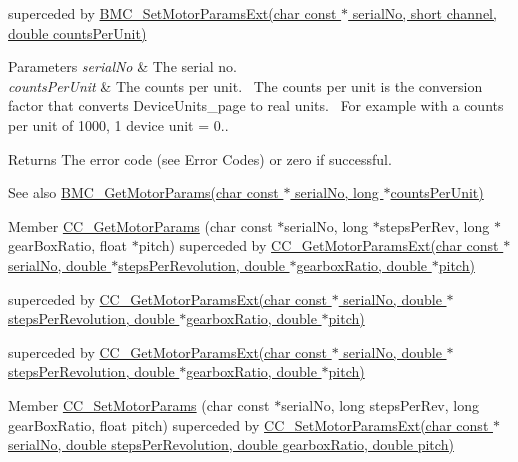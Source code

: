 superceded by \hyperlink{group___benchtop_brushless_motor_gaa40b14dfc57fee8de455b3b5f0b18490}{B\+M\+C\+\_\+\+Set\+Motor\+Params\+Ext(char const $\ast$ serial\+No, short channel, double counts\+Per\+Unit)} 


\begin{DoxyParams}{Parameters}
{\em serial\+No} & The serial no. \\
\hline
{\em counts\+Per\+Unit} & The counts per unit.~\newline
 The counts per unit is the conversion factor that converts Device\+Units\+\_\+page to real units.~\newline
 For example with a counts per unit of 1000, 1 device unit = 0.\+0001mm. \\
\hline
\end{DoxyParams}
\begin{DoxyReturn}{Returns}
The error code (see Error Codes) or zero if successful. 
\end{DoxyReturn}
\begin{DoxySeeAlso}{See also}
\hyperlink{group___t_cube_brushless_motor_ga4be244fc08f0b5fece85e121a5f240c4}{B\+M\+C\+\_\+\+Get\+Motor\+Params(char const $\ast$ serial\+No, long $\ast$counts\+Per\+Unit)}


\end{DoxySeeAlso}


\label{deprecated__deprecated000008}%
\hypertarget{deprecated__deprecated000008}{}%
Member \hyperlink{group___k_cube_d_c_servo_ga0e58fd23935075c1488536435b166eab}{C\+C\+\_\+\+Get\+Motor\+Params} (char const $\ast$serial\+No, long $\ast$steps\+Per\+Rev, long $\ast$gear\+Box\+Ratio, float $\ast$pitch) superceded by \hyperlink{group___t_cube_d_c_servo_ga24e4645360d24ca87fc7c310f2a556db}{C\+C\+\_\+\+Get\+Motor\+Params\+Ext(char const $\ast$ serial\+No, double $\ast$steps\+Per\+Revolution, double $\ast$gearbox\+Ratio, double $\ast$pitch)} 

superceded by \hyperlink{group___t_cube_d_c_servo_ga24e4645360d24ca87fc7c310f2a556db}{C\+C\+\_\+\+Get\+Motor\+Params\+Ext(char const $\ast$ serial\+No, double $\ast$steps\+Per\+Revolution, double $\ast$gearbox\+Ratio, double $\ast$pitch)} 

superceded by \hyperlink{group___t_cube_d_c_servo_ga24e4645360d24ca87fc7c310f2a556db}{C\+C\+\_\+\+Get\+Motor\+Params\+Ext(char const $\ast$ serial\+No, double $\ast$steps\+Per\+Revolution, double $\ast$gearbox\+Ratio, double $\ast$pitch)} 

\label{deprecated__deprecated000007}%
\hypertarget{deprecated__deprecated000007}{}%
Member \hyperlink{group___k_cube_d_c_servo_gab68a36d57eb3dac43472ad435b1fcdcb}{C\+C\+\_\+\+Set\+Motor\+Params} (char const $\ast$serial\+No, long steps\+Per\+Rev, long gear\+Box\+Ratio, float pitch) superceded by \hyperlink{group___t_cube_d_c_servo_ga8231c0203d1e6fdf08b58bfc47646241}{C\+C\+\_\+\+Set\+Motor\+Params\+Ext(char const $\ast$ serial\+No, double steps\+Per\+Revolution, double gearbox\+Ratio, double pitch)} 

